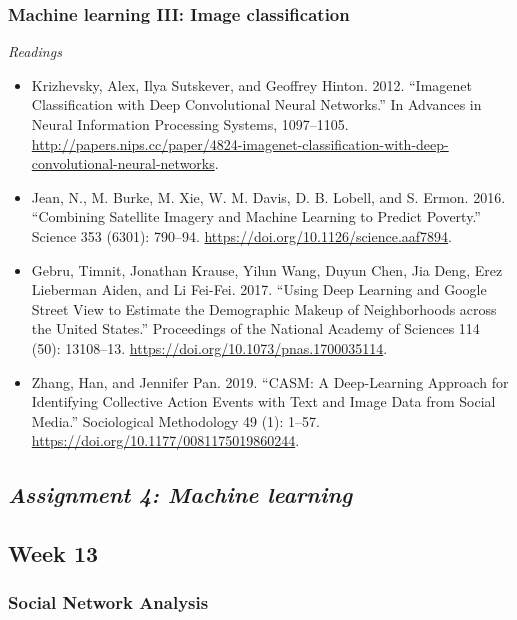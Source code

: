 \documentclass[
  10pt,
]{article}
\providecommand{\tightlist}{%
  \setlength{\itemsep}{0pt}\setlength{\parskip}{0pt}}
\begin{document}
\hypertarget{machine-learning-iii-image-classification}{%
\subsubsection{Machine learning III: Image
classification}\label{machine-learning-iii-image-classification}}

\emph{Readings}

\begin{itemize}
\tightlist
\item
  Krizhevsky, Alex, Ilya Sutskever, and Geoffrey Hinton. 2012.
  ``Imagenet Classification with Deep Convolutional Neural Networks.''
  In Advances in Neural Information Processing Systems, 1097--1105.
  \url{http://papers.nips.cc/paper/4824-imagenet-classification-with-deep-convolutional-neural-networks}.
\item
  Jean, N., M. Burke, M. Xie, W. M. Davis, D. B. Lobell, and S. Ermon.
  2016. ``Combining Satellite Imagery and Machine Learning to Predict
  Poverty.'' Science 353 (6301): 790--94.
  \url{https://doi.org/10.1126/science.aaf7894}.
\item
  Gebru, Timnit, Jonathan Krause, Yilun Wang, Duyun Chen, Jia Deng, Erez
  Lieberman Aiden, and Li Fei-Fei. 2017. ``Using Deep Learning and
  Google Street View to Estimate the Demographic Makeup of Neighborhoods
  across the United States.'' Proceedings of the National Academy of
  Sciences 114 (50): 13108--13.
  \url{https://doi.org/10.1073/pnas.1700035114}.
\item
  Zhang, Han, and Jennifer Pan. 2019. ``CASM: A Deep-Learning Approach
  for Identifying Collective Action Events with Text and Image Data from
  Social Media.'' Sociological Methodology 49 (1): 1--57.
  \url{https://doi.org/10.1177/0081175019860244}.
\end{itemize}

\hypertarget{assignment-4-machine-learning}{%
\subsection{\texorpdfstring{\emph{Assignment 4: Machine
learning}}{Assignment 4: Machine learning}}\label{assignment-4-machine-learning}}

\hypertarget{week-13}{%
\subsection{Week 13}\label{week-13}}

\hypertarget{social-network-analysis}{%
\subsubsection{Social Network Analysis}\label{social-network-analysis}}
\end{document}
